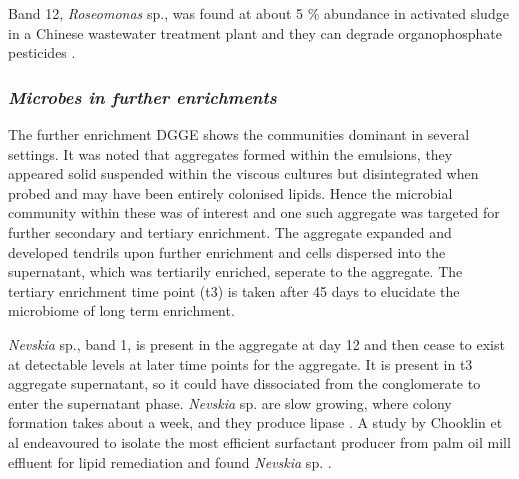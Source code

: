 \documentclass[11pt]{article}
\begin{document}
Band 12, \emph{Roseomonas} sp., was found at about 5 \% abundance in activated sludge in a Chinese wastewater treatment plant and they can degrade organophosphate pesticides \cite{jiang2008bacterial,jiang2006isolation}.

\subsubsection{\emph{Microbes in further enrichments}}
The further enrichment DGGE shows the communities dominant in several settings. It was noted that aggregates formed within the emulsions, they appeared solid suspended within the viscous cultures but disintegrated when probed and may have been entirely colonised lipids. Hence the microbial community within these was of interest and one such aggregate was targeted for further secondary and tertiary enrichment. The aggregate expanded and developed tendrils upon further enrichment and cells dispersed into the supernatant, which was tertiarily enriched, seperate to the aggregate. The tertiary enrichment time point (t3) is taken after 45 days to elucidate the microbiome of long term enrichment.


\emph{Nevskia} sp., band 1, is present in the aggregate at day 12 and then cease to exist at detectable levels at later time points for the aggregate. It is present in t3 aggregate supernatant, so it could have dissociated from the conglomerate to enter the supernatant phase. \emph{Nevskia} sp. are slow growing, where colony formation takes about a week, and they produce lipase \cite{kim2011nevskia}. A study by Chooklin et al endeavoured to isolate the most efficient surfactant producer from palm oil mill effluent for lipid remediation and found \emph{Nevskia} sp. \cite{chooklinutilization}.
\end{document}
